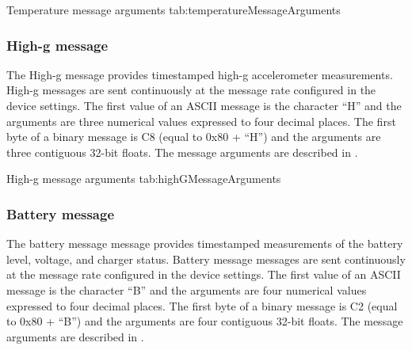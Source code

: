 \begingroup
    \def\tempArgumentA{Temperature in degrees Celsius}
    \dataMessageTable
    {Temperature message arguments}
    {tab:temperatureMessageArguments}
\endgroup

\begingroup
    \def\tempNameA{Temperature}
    \def\tempValueA{25}
    \def\tempAsciiFirst{T}
    \def\tempAsciiA{25.0000}
    \def\tempBinaryFirst{D4}
    \def\tempBinaryA{00 00 41 C8}
    \dataMessageExample
\endgroup

\subsubsection{High-g message}

The High-g message provides timestamped high-g accelerometer measurements.  High-g messages are sent continuously at the message rate configured in the device settings.  The first value of an \ac{ASCII} message is the character \enquote{H} and the arguments are three numerical values expressed to four decimal places.  The first byte of a binary message is C8 (equal to 0x80 + \enquote{H}) and the arguments are three contiguous 32-bit floats.  The message arguments are described in .

\begingroup
    \def\tempArgumentA{High-g accelerometer X axis in g}
    \def\tempArgumentB{High-g accelerometer Y axis in g}
    \def\tempArgumentC{High-g accelerometer Z axis in g}
    \dataMessageTable
    {High-g message arguments}
    {tab:highGMessageArguments}
\endgroup

\begingroup
    \def\tempNameA{High-g accelerometer X axis}
    \def\tempNameB{High-g accelerometer Y axis}
    \def\tempNameC{High-g accelerometer Z axis}
    \def\tempValueA{0.0}
    \def\tempValueB{0.0}
    \def\tempValueC{1.0}
    \def\tempAsciiFirst{H}
    \def\tempAsciiA{0.0000}
    \def\tempAsciiB{0.0000}
    \def\tempAsciiC{1.0000}
    \def\tempBinaryFirst{C8}
    \def\tempBinaryA{00 00 00 00}
    \def\tempBinaryB{00 00 00 00}
    \def\tempBinaryC{00 00 80 3F}
    \dataMessageExample
\endgroup

\subsubsection{Battery message}

The battery message message provides timestamped measurements of the battery level, voltage, and charger status.  Battery message messages are sent continuously at the message rate configured in the device settings.  The first value of an \ac{ASCII} message is the character \enquote{B} and the arguments are four numerical values expressed to four decimal places.  The first byte of a binary message is C2 (equal to 0x80 + \enquote{B}) and the arguments are four contiguous 32-bit floats.  The message arguments are described in .


